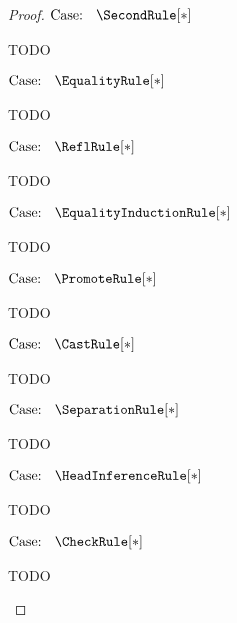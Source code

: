 \begin{proof}
$\text{Case: }\begin{array}{c} \SecondRule[*] \end{array}$
\begin{proofcase}
    TODO
\end{proofcase}

$\text{Case: }\begin{array}{c} \EqualityRule[*] \end{array}$
\begin{proofcase}
    TODO
\end{proofcase}

$\text{Case: }\begin{array}{c} \ReflRule[*] \end{array}$
\begin{proofcase}
    TODO
\end{proofcase}

$\text{Case: }\begin{array}{c} \EqualityInductionRule[*] \end{array}$
\begin{proofcase}
    TODO
\end{proofcase}

$\text{Case: }\begin{array}{c} \PromoteRule[*] \end{array}$
\begin{proofcase}
    TODO
\end{proofcase}

$\text{Case: }\begin{array}{c} \CastRule[*] \end{array}$
\begin{proofcase}
    TODO
\end{proofcase}

$\text{Case: }\begin{array}{c} \SeparationRule[*] \end{array}$
\begin{proofcase}
    TODO
\end{proofcase}

$\text{Case: }\begin{array}{c} \HeadInferenceRule[*] \end{array}$
\begin{proofcase}
    TODO
\end{proofcase}

$\text{Case: }\begin{array}{c} \CheckRule[*] \end{array}$
\begin{proofcase}
    TODO
\end{proofcase}


\end{proof}
